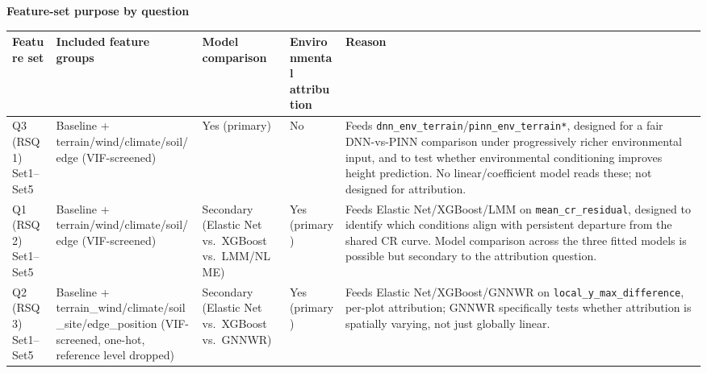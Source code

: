 \begin{table}[H]
\centering
\textbf{Feature-set purpose by question}\\[4pt]
\scriptsize
\begin{tabularx}{\linewidth}{@{} p{2.6cm} >{\hsize=0.75\hsize\raggedright\arraybackslash}X p{2.1cm} p{1.5cm} >{\hsize=1.25\hsize\raggedright\arraybackslash}X @{}}
\toprule
Feature set & Included feature groups & Model comparison & Environmental attribution & Reason \\
\midrule
Q3 (RSQ1) Set1--Set5 & Baseline + terrain/wind/climate/soil/edge (VIF-screened) & Yes (primary) & No & Feeds \texttt{dnn\_env\_terrain}/\texttt{pinn\_env\_terrain*}, designed for a fair DNN-vs-PINN comparison under progressively richer environmental input, and to test whether environmental conditioning improves height prediction. No linear/coefficient model reads these; not designed for attribution. \\
Q1 (RSQ2) Set1--Set5 & Baseline + terrain/wind/climate/soil/edge (VIF-screened) & Secondary (Elastic Net vs.\ XGBoost vs.\ LMM/NLME) & Yes (primary) & Feeds Elastic Net/XGBoost/LMM on \texttt{mean\_cr\_residual}, designed to identify which conditions align with persistent departure from the shared CR curve. Model comparison across the three fitted models is possible but secondary to the attribution question. \\
Q2 (RSQ3) Set1--Set5 & Baseline + terrain\_wind/climate/soil\_site/edge\_position (VIF-screened, one-hot, reference level dropped) & Secondary (Elastic Net vs.\ XGBoost vs.\ GNNWR) & Yes (primary) & Feeds Elastic Net/XGBoost/GNNWR on \texttt{local\_y\_max\_difference}, per-plot attribution; GNNWR specifically tests whether attribution is spatially varying, not just globally linear. \\

\end{tabularx}
\end{table}
